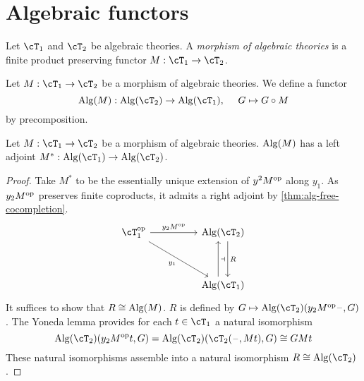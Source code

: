 \documentclass{zett}
\begin{document}
\section{Algebraic functors}
\label{sec:algebraic-functors}

\begin{defn}
  Let $\cT_{1}$ and $\cT_{2}$ be algebraic theories.
  A \emph{morphism of algebraic theories} is a finite product preserving functor $M : \cT_{1} \to \cT_{2}$.
\end{defn}

\begin{defn}
  Let $M : \cT_{1} \to \cT_{2}$ be a morphism of algebraic theories.
  We define a functor
  \[
    \Alg(M) : \Alg(\cT_{2}) \to \Alg(\cT_{1}),\quad~G \mapsto G \circ M
  \]
  by precomposition.
\end{defn}

\begin{thm}\label{thm:algebraic-functor-left-adjoint}
  Let $M : \cT_{1} \to \cT_{2}$ be a morphism of algebraic theories.
  $\operatorname{Alg}(M)$ has a left adjoint $M^{*} : \Alg(\cT_{1}) \to \Alg(\cT_{2})$.
\end{thm}
\begin{proof}
  Take $M^{*}$ to be the essentially unique extension of $y^{2}M^{\mathrm{op}}$ along $y_{1}$.
  As $y_{2}M^{\mathrm{op}}$ preserves finite coproducts, it admits a right adjoint by \cref{thm:alg-free-cocompletion}.
  \[\begin{tikzcd}
      {\cT_{1}\op} && {\Alg(\cT_{2})} \\
      \\
      && {\Alg(\cT_{1})}
      \arrow["{y_{2}M\op}", from=1-1, to=1-3]
      \arrow[""{name=0, anchor=center, inner sep=0}, "{R}", shift left=2, from=1-3, to=3-3]
      \arrow[""{name=1, anchor=center, inner sep=0}, shift left=2, from=3-3, to=1-3]
      \arrow["{y_{1}}"', from=1-1, to=3-3]
      \arrow["\dashv"{anchor=center}, draw=none, from=1, to=0]
    \end{tikzcd}\]
  It suffices to show that $R \cong \operatorname{Alg}(M)$.
  $R$ is defined by $G \mapsto \Alg(\cT_{2})(y_{2}M\op\blank, G)$.
  The Yoneda lemma provides for each $t \in \cT_{1}$ a natural isomorphism
  \[
    \Alg(\cT_{2})(y_{2}M\op t, G) = \Alg(\cT_{2})(\cT_{2}(\blank, Mt), G) \iso GMt
  \]
  These natural isomorphisms assemble into a natural isomorphism $R \iso \Alg(\cT_{2})$.
\end{proof}
\end{document}
